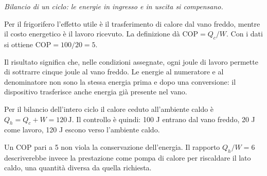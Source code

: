 \documentclass[11pt,a4paper]{article}
\begin{document}
\begin{samepage}
\begin{center}
\par
\small\itshape Bilancio di un ciclo: le energie in ingresso e in uscita si compensano.
\end{center}
Per il frigorifero l’effetto utile è il trasferimento di calore dal vano freddo, mentre il costo energetico è il lavoro ricevuto. La definizione dà \(\mathrm{COP}=Q_c/W\). Con i dati si ottiene \(\mathrm{COP}=100/20=5\).\par

Il risultato significa che, nelle condizioni assegnate, ogni joule di lavoro permette di sottrarre cinque joule al vano freddo. Le energie al numeratore e al denominatore non sono la stessa energia prima e dopo una conversione: il dispositivo trasferisce anche energia già presente nel vano.\par

Per il bilancio dell’intero ciclo il calore ceduto all’ambiente caldo è \(Q_h=Q_c+W=120\,\mathrm J\). Il controllo è quindi: 100 J entrano dal vano freddo, 20 J come lavoro, 120 J escono verso l’ambiente caldo.\par

Un COP pari a 5 non viola la conservazione dell’energia. Il rapporto \(Q_h/W=6\) descriverebbe invece la prestazione come pompa di calore per riscaldare il lato caldo, una quantità diversa da quella richiesta.\par

\end{samepage}
\end{document}
